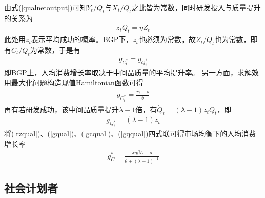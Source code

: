 \documentclass[cn,normal,11pt,black]{elegantnote}
\begin{document}
    由式(\ref{qualnetoutput})可知$Y_t/Q_t$与$X_t/Q_t$之比皆为常数，同时研发投入与质量提升的关系为
    \begin{align}
        z_t Q_t = \eta Z_t
    \end{align}
    此处用$z_t$表示平均成功的概率。BGP下，$z_t$也必须为常数，故$Z_t/Q_t$也为常数，即有$C_t/Q_t$为常数，于是有
    \begin{align}\label{gqual}
        g_{C^*_t} = g_{Q^*_t} 
    \end{align}
    即BGP上，人均消费增长率取决于中间品质量的平均提升率。
    另一方面，求解效用最大化问题构造现值Hamiltonian函数可得
    \begin{align}\label{gcqual}
    \begin{aligned}
        g_{C^*_t} = \frac{r_t -  \rho}{\theta} 
    \end{aligned}
    \end{align}
    再有若研发成功，该中间品质量提升$\lambda -1$倍，有$\dot{Q}_t=(\lambda-1) z_t Q_t$，即
    \begin{align}\label{gqqual}
        g_{Q^*_t} = (\lambda -1)z_t 
    \end{align}
    将(\ref{rzqual})、(\ref{gqual})、(\ref{gcqual})、(\ref{gqqual})四式联可得市场均衡下的人均消费增长率
    \begin{align}\label{qualgcmkt}
        g_C^{*}=\frac{\lambda \eta \beta L-\rho}{\theta+(\lambda-1)^{-1}}
    \end{align}
    

\subsection{社会计划者}
\end{document}
